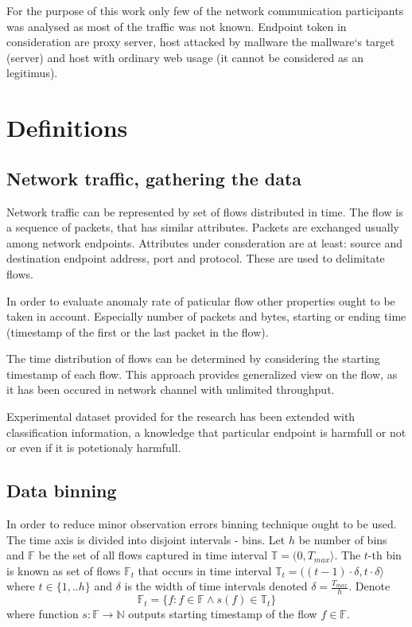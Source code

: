 \documentclass[a4paper]{IEEEtran}
\begin{document}
For the purpose of this work only few of the network communication 
participants was analysed as most of the traffic was not known.
Endpoint token in consideration are proxy server, host attacked by mallware
the mallware`s target (server) and host with ordinary web usage (it cannot be
considered as an legitimus).

\section{Definitions}
\subsection{Network traffic, gathering the data}
Network traffic can be represented by set of flows distributed in time.
The flow is a sequence of packets, that has similar attributes. Packets
are exchanged usually among network endpoints. Attributes
under consderation are at least: source and destination endpoint address, port and
protocol. These are used to delimitate flows.

In order to evaluate anomaly rate of paticular flow other properties ought to be
taken in account. Especially number of packets and bytes, starting or ending time
(timestamp of the first or the last packet in the flow).

The time distribution of flows can be determined by considering the
starting timestamp of each flow. This approach provides generalized view on the flow, 
as it has been occured in network channel with unlimited throughput.

Experimental dataset provided for the research has been extended with
classification information, a knowledge that particular endpoint is 
harmfull or not or even if it is potetionaly harmfull.

\subsection{Data binning}
In order to reduce minor observation errors binning technique ought to be used.
The time axis is divided into disjoint intervals - bins.
Let $h$ be number of bins and $\mathbb{F}$ be the set of all flows captured in time interval
$\mathbb{T} = (0, T_{max}\rangle $. The $t$-th bin is known as 
set of flows $\mathbb{F}_t$ 
that occurs in time interval
$\mathbb{T}_t = ((t-1)\cdot \delta, t\cdot \delta\rangle $ where 
$t \in \{1, .. h\}$ and $\delta$ is the width of time intervals
denoted $\delta = \frac{T_{max}}{h}$.
Denote
\begin{equation}
\mathbb{F}_t = \{f : f \in \mathbb{F} \wedge s(f) \in \mathbb{T}_t \}
\end{equation}
where function $s:\mathbb{F} \rightarrow \mathbb{N} $ 
outputs starting timestamp of the flow $f\in \mathbb{F}$.
\end{document}
